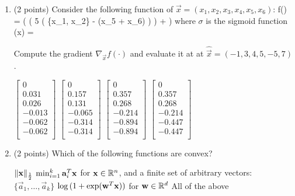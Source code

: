\begin{enumerate}[start]
\vspace{2cm}

	\item
	(2 points)
	Consider the following function of $\vec{x} = (x_1, x_2, x_3, x_4, x_5, x_6)$:
	\beqn
	f() = \sigma\left( \log\left( 5 \left(
	\max\{x_1, x_2\} \cdot {} - (x_5 + x_6) \right)
	\right) +  \right)
	\eeqn
	where $\sigma$ is the sigmoid function
	\beqn
	\sigma(x) = 
	\eeqn
	
	Compute the gradient $\nabla_{\vec{x}} f(\cdot)$ and evaluate it at at $\hat{\vec{x}} = (-1, 3, 4, 5, -5, 7)$.
	
\begin{oneparcheckboxes}
	\choice 
	$\begin{bmatrix}
		0 \\
		0.031 \\
		0.026 \\
		-0.013 \\
		-0.062 \\
		-0.062 \\
	\end{bmatrix}$
 \choice $\begin{bmatrix}
	0 \\
	0.157 \\
	0.131 \\
	-0.065 \\
	-0.314 \\
	-0.314 \\
	\end{bmatrix}$
	\choice $\begin{bmatrix}
	0 \\
	0.357 \\
	0.268 \\
	-0.214 \\
	-0.894 \\
	-0.894 \\
	\end{bmatrix}$
	\choice $\begin{bmatrix}
	0 \\
	0.357 \\
	0.268 \\
	-0.214 \\
	-0.447 \\
	-0.447 \\
	\end{bmatrix}$
\end{oneparcheckboxes}

\item (2 points) Which of the following functions are convex?
\begin{checkboxes}
\choice $\|\mathbf{x}\|_{\frac{1}{2}}$ 
\choice $\min_{i=1}^k \mathbf{a}_{i}^T \mathbf{x}$ for $\mathbf{x} \in \mathbb{R}^n$, and a finite set of arbitrary vectors: $\{\vec{a}_1, \dots, \vec{a}_k\}$
\choice $\log{(1+\exp(\mathbf{w}^T \mathbf{x}))} $ for $\mathbf{w} \in \mathbb{R}^d$
\choice All of the above
\end{checkboxes}



\end{enumerate}
